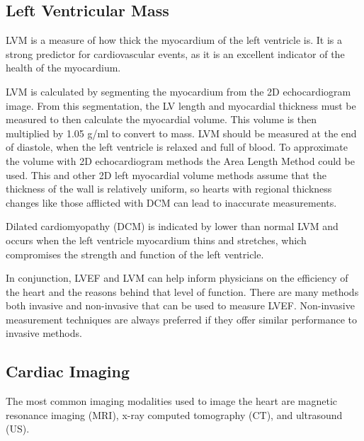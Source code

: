 \documentclass[12pt]{article}
\begin{document}
\subsection{Left Ventricular Mass}
LVM is a measure of how thick the myocardium of the left ventricle is.
It is a strong predictor for cardiovascular events\cite{cardiac_chamber_quant_update}, as it is an excellent indicator of the health of the myocardium.

LVM is calculated by segmenting the myocardium from the 2D echocardiogram image.
From this segmentation, the LV length and myocardial thickness must be measured to then calculate the myocardial volume. This volume is then multiplied by 1.05 g/ml to convert to mass. \cite{LVM_paper}
LVM should be measured at the end of diastole, when the left ventricle is relaxed and full of blood.
To approximate the volume with 2D echocardiogram methods the Area Length Method \cite{are_length_method_webpage} could be used.
This and other 2D left myocardial volume  methods assume that the thickness of the wall is relatively uniform, so hearts with regional thickness changes like those afflicted with DCM can lead to inaccurate measurements. 

Dilated cardiomyopathy (DCM) is indicated by lower than normal LVM  and occurs when the left ventricle myocardium thins and stretches, which compromises the strength and function of the left ventricle. 

In conjunction, LVEF and LVM can help inform physicians on the efficiency of the heart and the reasons behind that level of function.
There are many methods both invasive and non-invasive that can be used to measure LVEF.
Non-invasive measurement techniques are always preferred if they offer similar performance to invasive methods.


\subsection{Cardiac Imaging}

The most common imaging modalities used to image the heart are magnetic resonance imaging (MRI), x-ray computed tomography (CT), and ultrasound (US).
\end{document}
